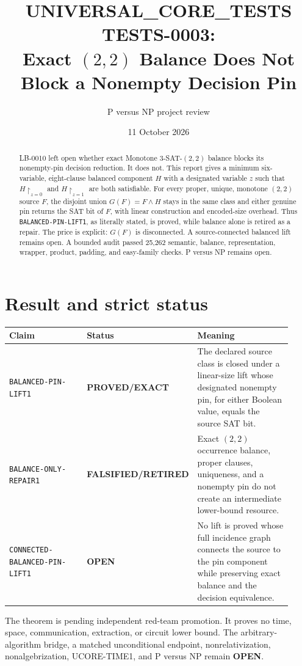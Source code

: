 \documentclass[11pt]{article}
\title{UNIVERSAL\_CORE\_TESTS TESTS-0003:\\
Exact $(2,2)$ Balance Does Not Block a Nonempty Decision Pin}
\author{P versus NP project review}
\date{11 October 2026}
\newcommand{\EXACT}{\textbf{PROVED/EXACT}}
\newcommand{\OPEN}{\textbf{OPEN}}
\newcommand{\RETIRED}{\textbf{FALSIFIED/RETIRED}}
\begin{document}
\maketitle

\begin{abstract}
LB-0010 left open whether exact Monotone $3$-SAT-$(2,2)$ balance blocks its
nonempty-pin decision reduction.  It does not.  This report gives a minimum
six-variable, eight-clause balanced component $H$ with a designated variable
$z$ such that $H\upharpoonright_{z=0}$ and
$H\upharpoonright_{z=1}$ are both satisfiable.  For every proper, unique,
monotone $(2,2)$ source $F$, the disjoint union $G(F)=F\wedge H$ stays in the
same class and either genuine pin returns the SAT bit of $F$, with linear
construction and encoded-size overhead.  Thus \texttt{BALANCED-PIN-LIFT1},
as literally stated, is proved, while balance alone is retired as a repair.
The price is explicit: $G(F)$ is disconnected.  A source-connected balanced
lift remains open.  A bounded audit passed 25,262 semantic, balance,
representation, wrapper, product, padding, and easy-family checks.  P versus
NP remains open.
\end{abstract}

\section{Result and strict status}

\begin{center}
\small
\begin{tabular}{p{0.31\linewidth}p{0.22\linewidth}p{0.39\linewidth}}
\toprule
Claim & Status & Meaning\\
\midrule
\texttt{BALANCED-PIN-LIFT1} & \EXACT &
The declared source class is closed under a linear-size lift whose designated
nonempty pin, for either Boolean value, equals the source SAT bit.\\
\texttt{BALANCE-ONLY-REPAIR1} & \RETIRED &
Exact $(2,2)$ occurrence balance, proper clauses, uniqueness, and a
nonempty pin do not create an intermediate lower-bound resource.\\
\texttt{CONNECTED-BALANCED-PIN-LIFT1} & \OPEN &
No lift is proved whose full incidence graph connects the source to the pin
component while preserving exact balance and the decision equivalence.\\
\bottomrule
\end{tabular}
\end{center}

The theorem is pending independent red-team promotion.  It proves no time,
space, communication, extraction, or circuit lower bound.  The
arbitrary-algorithm bridge, a matched unconditional endpoint,
nonrelativization, nonalgebrization, UCORE-TIME1, and P versus NP remain
\OPEN.
\end{document}
